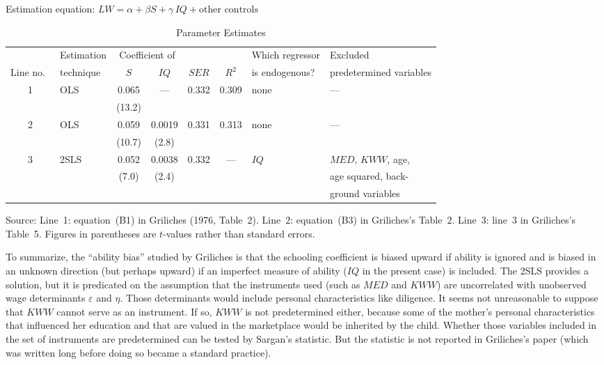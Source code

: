 \begin{table}[htbp]
\centering
\caption{Parameter Estimates}
\label{tab:3.2}
\medskip
Estimation equation: $LW = \alpha + \beta S + \gamma\, IQ + \text{other controls}$
\medskip

\begin{tabular}{@{}c l cc cc l l@{}}
\toprule
& Estimation & \multicolumn{2}{c}{Coefficient of}
& & & Which regressor & Excluded \\
\cmidrule(lr){3-4}
Line no.\ & technique & $S$ & $IQ$ & $SER$ & $R^2$
& is endogenous? & predetermined variables \\
\midrule
1 & OLS & 0.065 & --- & 0.332 & 0.309 & none & --- \\
  &     & (13.2) & & & & & \\[4pt]
2 & OLS & 0.059 & 0.0019 & 0.331 & 0.313 & none & --- \\
  &     & (10.7) & (2.8) & & & & \\[4pt]
3 & 2SLS & 0.052 & 0.0038 & 0.332 & --- & $IQ$ & $MED$, $KWW$, age, \\
  &      & (7.0) & (2.4) & & & & age squared, back- \\
  &      &       &        & & & & ground variables \\
\bottomrule
\end{tabular}

\smallskip
{\footnotesize Source: Line~1: equation~(B1) in Griliches (1976, Table~2).
Line~2: equation~(B3) in Griliches's Table~2.
Line~3: line~3 in Griliches's Table~5.
Figures in parentheses are $t$-values rather than standard errors.}
\end{table}

To summarize, the ``ability bias'' studied by Griliches is that the schooling
coefficient is biased upward if ability is ignored and is biased in an unknown direction
(but perhaps upward) if an imperfect measure of ability ($IQ$ in the present case)
is included.  The 2SLS provides a solution, but it is predicated on the assumption
that the instruments used (such as $MED$ and $KWW$) are uncorrelated with unobserved
wage determinants $\varepsilon$ and $\eta$.  Those determinants would include personal
characteristics like diligence.  It seems not unreasonable to suppose that $KWW$
cannot serve as an instrument.  If so, $KWW$ is not predetermined either, because some
of the mother's personal characteristics that influenced her education and that are
valued in the marketplace would be inherited by the child.  Whether those variables
included in the set of instruments are predetermined can be tested by Sargan's
statistic.  But the statistic is not reported in Griliches's paper (which was written
long before doing so became a standard practice).

